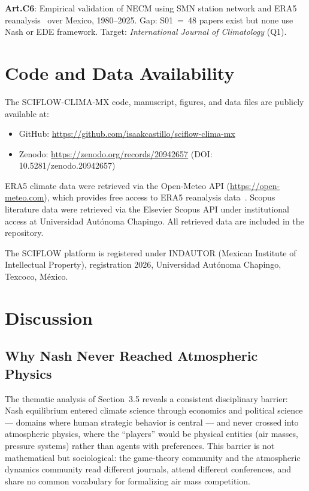 \documentclass[12pt,a4paper]{article}
\begin{document}
\textbf{Art.C6}: Empirical validation of NECM using SMN station
network and ERA5 reanalysis~\citep{Hersbach2020, Munoz2021} over Mexico, 1980--2025.
Gap: S01~=~48 papers exist but none use Nash or EDE framework.
Target: \textit{International Journal of Climatology} (Q1).



\section{Code and Data Availability}

The SCIFLOW-CLIMA-MX code, manuscript, figures, and data files
are publicly available at:

\begin{itemize}
\item GitHub: \url{https://github.com/isaakcastillo/sciflow-clima-mx}
\item Zenodo: \url{https://zenodo.org/records/20942657} (DOI: 10.5281/zenodo.20942657)
\end{itemize}

ERA5 climate data were retrieved via the Open-Meteo API
(\url{https://open-meteo.com}), which provides free access to
ERA5 reanalysis data~\citep{Hersbach2020}.
Scopus literature data were retrieved via the Elsevier Scopus API
under institutional access at Universidad Autónoma Chapingo.
All retrieved data are included in the repository.

The SCIFLOW platform is registered under INDAUTOR (Mexican
Institute of Intellectual Property), registration 2026,
Universidad Autónoma Chapingo, Texcoco, México.

\section{Discussion}

\subsection{Why Nash Never Reached Atmospheric Physics}

The thematic analysis of Section~3.5 reveals a consistent disciplinary
barrier: Nash equilibrium entered climate science through economics and
political science — domains where human strategic behavior is central —
and never crossed into atmospheric physics, where the ``players'' would
be physical entities (air masses, pressure systems) rather than agents
with preferences. This barrier is not mathematical but sociological:
the game-theory community and the atmospheric dynamics community read
different journals, attend different conferences, and share no common
vocabulary for formalizing air mass competition.
\end{document}
